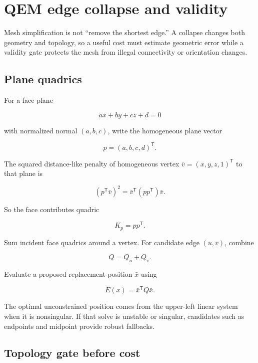 \hypertarget{appendix-89db9fe1bc8a}{}\label{referencestart:appendix-89db9fe1bc8a}
\section{QEM edge collapse and validity}\label{appendix-89db9fe1bc8a-qem-edge-collapse-and-validity}

\hypertarget{appendix-89db9fe1bc8a-qem-edge-collapse-and-validity}{}

Mesh simplification is not ``remove the shortest edge.'' A collapse changes both geometry and topology, so a useful cost must estimate geometric error while a validity gate protects the mesh from illegal connectivity or orientation changes.

\subsection{Plane quadrics}\label{appendix-89db9fe1bc8a-plane-quadrics}

\hypertarget{appendix-89db9fe1bc8a-plane-quadrics}{}

For a face plane

\[
ax+by+cz+d=0
\]

with normalized normal \((a,b,c)\), write the homogeneous plane vector

\[
p=(a,b,c,d)^{\mathsf T}.
\]

The squared distance-like penalty of homogeneous vertex \(\bar v=(x,y,z,1)^{\mathsf T}\) to that plane is

\[
(p^{\mathsf T}\bar v)^2
=
\bar v^{\mathsf T}(pp^{\mathsf T})\bar v.
\]

So the face contributes quadric

\[
K_p=pp^{\mathsf T}.
\]

Sum incident face quadrics around a vertex. For candidate edge \((u,v)\), combine

\[
Q=Q_u+Q_v.
\]

Evaluate a proposed replacement position \(\bar x\) using

\[
E(x)=\bar x^{\mathsf T}Q\bar x.
\]

The optimal unconstrained position comes from the upper-left linear system when it is nonsingular. If that solve is unstable or singular, candidates such as endpoints and midpoint provide robust fallbacks.

\subsection{Topology gate before cost}\label{appendix-89db9fe1bc8a-topology-gate-before-cost}

